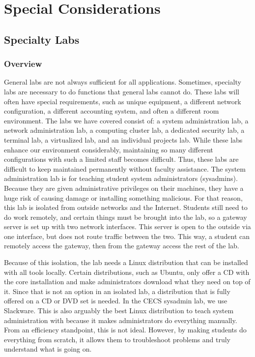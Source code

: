 \chapter{Special Considerations} \label{ch:special_considerations}
\section{Specialty Labs} \label{sec:specialty_labs}
\subsection{Overview}
General labs are not always sufficient for all applications.  Sometimes, specialty labs are necessary to do functions that general labs cannot do.  These labs will often have special requirements, such as unique equipment, a different network configuration, a different accounting system, and often a different room environment.  The labs we have covered consist of:  a system administration lab, a network administration lab, a computing cluster lab, a dedicated security lab, a terminal lab, a virtualized lab, and an individual projects lab. While these labs enhance our environment considerably, maintaining so many different configurations with such a limited staff becomes difficult. Thus, these labs are difficult to keep maintained permanently without faculty assistance.  
The system administration lab is for teaching student system administrators (sysadmins).  Because they are given administrative privileges on their machines, they have a huge risk of causing damage or installing something malicious.  For that reason, this lab is isolated from outside networks and the Internet.  Students still need to do work remotely, and certain things must be brought into the lab, so a gateway server is set up with two network interfaces.  This server is open to the outside via one interface, but does not route traffic between the two.  This way, a student can remotely access the gateway, then from the gateway access the rest of the lab.  

Because of this isolation, the lab needs a Linux distribution that can be installed with all tools locally.  Certain distributions, such as Ubuntu, only offer a CD with the core installation and make administrators download what they need on top of it.  Since that is not an option in an isolated lab, a distribution that is fully offered on a CD or DVD set is needed.  In the CECS sysadmin lab, we use Slackware.  This is also arguably the best Linux distribution to teach system administration with because it makes administrators do everything manually.  From an efficiency standpoint, this is not ideal.  However, by making students do everything from scratch, it allows them to troubleshoot problems and truly understand what is going on.  

